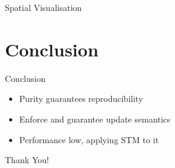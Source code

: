 \documentclass{beamer}
\begin{document}
\begin{frame}{Spatial Visualisation}
\end{frame}

\section{Conclusion}

\begin{frame}{Conclusion}
  \begin{itemize}
    \item Purity guarantees reproducibility 
    \item Enforce and guarantee update semantics 
    \item Performance low, applying STM to it
  \end{itemize}
\end{frame}

\begin{frame}{}
  \begin{center}
  Thank You!
  \end{center}
\end{frame}
\end{document}
